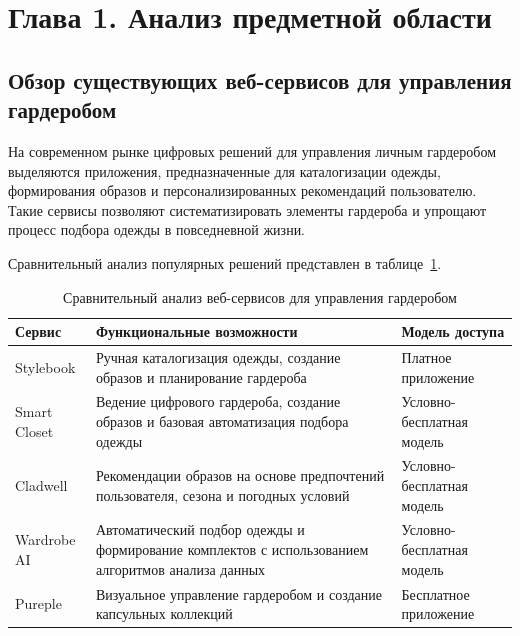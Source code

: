 \section*{Глава 1. Анализ предметной области}

\subsection{Обзор существующих веб-сервисов для управления гардеробом}

На современном рынке цифровых решений для управления личным гардеробом выделяются приложения, предназначенные для каталогизации одежды, формирования образов и персонализированных рекомендаций пользователю. Такие сервисы позволяют систематизировать элементы гардероба и упрощают процесс подбора одежды в повседневной жизни.

Сравнительный анализ популярных решений представлен в таблице~\ref{tab:wardrobe_services}.

\begin{table}[ht!]
	\centering
	\caption{Сравнительный анализ веб-сервисов для управления гардеробом}
	\label{tab:wardrobe_services}
	\begin{tabular}{|p{}|p{}|p{}|}
		\hline
		\textbf{Сервис} & \textbf{Функциональные возможности} & \textbf{Модель доступа} \\ \hline
		
		Stylebook &
		Ручная каталогизация одежды, создание образов и планирование гардероба &
		Платное приложение \\ \hline
		
		Smart Closet &
		Ведение цифрового гардероба, создание образов и базовая автоматизация подбора одежды &
		Условно-бесплатная модель \\ \hline
		
		Cladwell &
		Рекомендации образов на основе предпочтений пользователя, сезона и погодных условий &
		Условно-бесплатная модель \\ \hline
		
		Wardrobe AI &
		Автоматический подбор одежды и формирование комплектов с использованием алгоритмов анализа данных &
		Условно-бесплатная модель \\ \hline
		
		Pureple &
		Визуальное управление гардеробом и создание капсульных коллекций &
		Бесплатное приложение \\ \hline
		
	\end{tabular}
\end{table}

